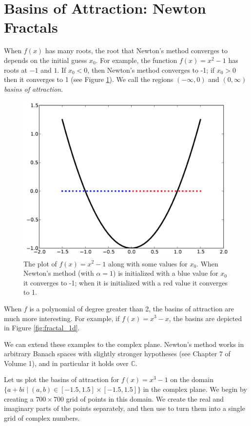 \section*{Basins of Attraction: Newton Fractals} %

When $f(x)$ has many roots, the root that Newton's method converges to depends on the initial guess $x_0$.
For example, the function $f(x)=x^2-1$ has roots at $-1$ and $1$.
If $x_0<0$, then Newton's method converges to -1; if $x_0>0$ then it converges to 1 (see Figure \ref{fig:basins1}).
We call the regions $(-\infty, 0)$ and $(0, \infty)$ \emph{basins of attraction}.

\begin{figure}[h]
    \centering
    \includegraphics[scale=0.5]{figures/basins1.pdf}
    \caption{The plot of $f(x) = x^2 -1$ along with some values for $x_0$.
    When Newton's method (with $\alpha=1$) is initialized with a blue value for $x_0$ it converges to -1; when it is initialized with a red value it converges to 1.}
    \label{fig:basins1}
\end{figure}

When $f$ is a polynomial of degree greater than 2, the basins of attraction are much more interesting.
For example, if $f(x) = x^3-x$, the basins are depicted in Figure \ref{fig:fractal_1d}.

We can extend these examples to the complex plane.
Newton's method works in arbitrary Banach spaces with slightly stronger hypotheses (see Chapter 7 of Volume 1), and in particular it holds over $\mathbb{C}$.

Let us plot the basins of attraction for $f(x) = x^3-1$ on the domain $\{a+bi \mid (a, b) \in [-1.5, 1.5] \times [-1.5, 1.5] \}$ in the complex plane.
We begin by creating a $700 \times 700$ grid of points in this domain.
We create the real and imaginary parts of the points separately, and then use  to turn them into a single grid of complex numbers.

